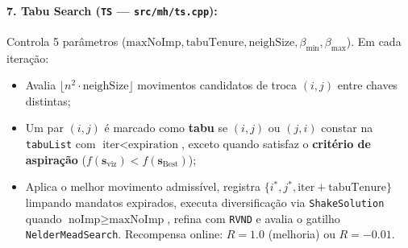 \documentclass[11pt,a4paper]{article}
\begin{document}
\paragraph{7. Tabu Search (\texttt{TS} --- \texttt{src/mh/ts.cpp}):}
Controla 5 parâmetros ($\text{maxNoImp}, \text{tabuTenure}, \text{neighSize}, \beta_{\min}, \beta_{\max}$). Em cada iteração:
\begin{itemize}[leftmargin=*]
  \item Avalia $\lfloor n^2 \cdot \text{neighSize} \rfloor$ movimentos candidatos de troca $(i, j)$ entre chaves distintas;
  \item Um par $(i,j)$ é marcado como \textbf{tabu} se $(i,j)$ ou $(j,i)$ constar na \texttt{tabuList} com $\text{iter} < \text{expiration}$, exceto quando satisfaz o \textbf{critério de aspiração} ($f(\mathbf{s}_{\text{viz}}) < f(\mathbf{s}_{\text{Best}})$);
  \item Aplica o melhor movimento admissível, registra $\{i^*, j^*, \text{iter} + \text{tabuTenure}\}$ limpando mandatos expirados, executa diversificação via \texttt{ShakeSolution} quando $\text{noImp} \ge \text{maxNoImp}$, refina com \texttt{RVND} e avalia o gatilho \texttt{NelderMeadSearch}. Recompensa online: $R = 1.0$ (melhoria) ou $R = -0.01$.
\end{itemize}
\end{document}
